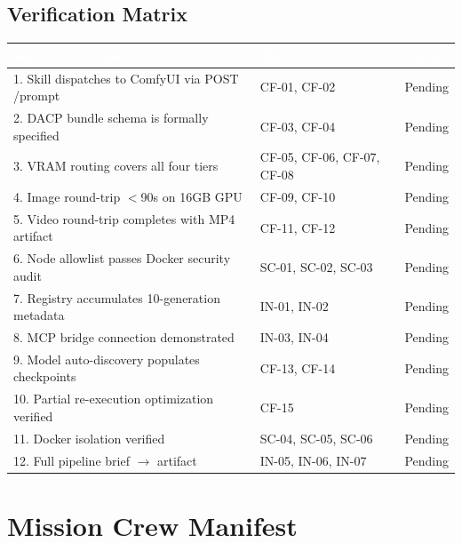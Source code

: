 \documentclass[11pt,letterpaper]{article}
\newcommand{\tableheader}[1]{\textbf{\sffamily\textcolor{white}{#1}}}
\begin{document}
\subsection{Verification Matrix}

\begin{center}
\begin{tabularx}{\textwidth}{XL{4cm}C{1.8cm}}
\toprule
{}
\tableheader{Success Criterion} & \tableheader{Test ID(s)} & \tableheader{Status} \\
. Skill dispatches to ComfyUI via POST /prompt & CF-01, CF-02 & Pending \\
2. DACP bundle schema is formally specified & CF-03, CF-04 & Pending \\
3. VRAM routing covers all four tiers & CF-05, CF-06, CF-07, CF-08 & Pending \\
4. Image round-trip $<$90s on 16GB GPU & CF-09, CF-10 & Pending \\
5. Video round-trip completes with MP4 artifact & CF-11, CF-12 & Pending \\
6. Node allowlist passes Docker security audit & SC-01, SC-02, SC-03 & Pending \\
7. Registry accumulates 10-generation metadata & IN-01, IN-02 & Pending \\
8. MCP bridge connection demonstrated & IN-03, IN-04 & Pending \\
9. Model auto-discovery populates checkpoints & CF-13, CF-14 & Pending \\
10. Partial re-execution optimization verified & CF-15 & Pending \\
11. Docker isolation verified & SC-04, SC-05, SC-06 & Pending \\
12. Full pipeline brief $\to$ artifact & IN-05, IN-06, IN-07 & Pending \\
\bottomrule
\end{tabularx}
\end{center}

\section{Mission Crew Manifest}
\end{document}
